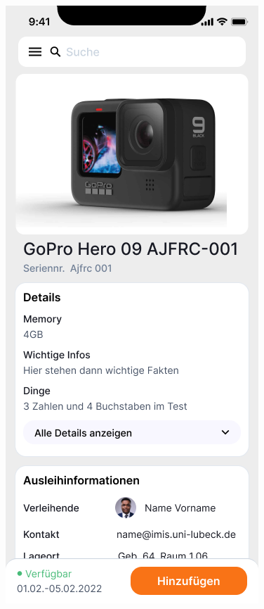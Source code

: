 \begin{figure}[h]
    \centering
    \includegraphics[scale=0.3]{Bilder/Prototyp/Neu/Datailansicht-1.png}\hspace{2em}

\end{figure}
